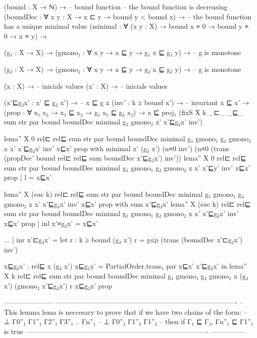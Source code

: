        (bound : X → ℕ) →                     -- bound function 
       -- the bound function is decreasing 
       (boundDec : ∀ {x y : X} → x ⊏ y → bound y < bound x) →  
       -- the bound function has a unique minimal value
       (minimal : ∀ (x y : X) → bound x ≡ 0 → bound y ≡ 0 → x ≡ y) → 

       (g₁ : X → X) → 
       (gmono₁ : ∀ {x y} → x ⊑ y → g₁ x ⊑ g₁ y) → -- g is monotone

       (g₂ : X → X) → 
       (gmono₂ : ∀ {x y} → x ⊑ y → g₂ x ⊑ g₂ y) → -- g is monotone

       (x : X) →                 -- inicials values  
       (x' : X) →                 -- inicials values   

       (x'⊑g₂x' : x' ⊑ g₂ x') →                    -- x ⊑ g x 
       (inv' : k ≥ bound x') →              -- invariant
       x ⊑ x' → 
       (prop : ∀ {x₁ x₂} → x₁ ⊑ x₂ → g₁ x₁ ⊑ g₂ x₂) →  
       x  ⊑ proj₁ (fixS X k _⊏_ _⊑_ sum str par bound boundDec minimal g₂ gmono₂ x' x'⊑g₂x' inv')

lema'' X 0 rel⊏  rel⊑ sum str par bound boundDec minimal g₁ gmono₁ g₂ gmono₂
       x x' x'⊑g₂x' inv' x⊑x' prop
            with minimal x' (g₂ x') (n≡0 inv')
                    (n≡0 (trans (propDec' bound rel⊏  rel⊑ sum boundDec x'⊑g₂x') inv'))
lema'' X 0 rel⊏  rel⊑ sum str par bound boundDec minimal g₁ gmono₁ g₂ gmono₂
       x  x' x'⊑y' inv' x⊑x' prop | l = x⊑x'

lema'' X (suc k) rel⊏  rel⊑ sum str par bound boundDec minimal g₁ gmono₁ g₂ gmono₂
       x x' x'⊑g₂x' inv' x⊑x' prop with sum x'⊑g₂x'
lema'' X (suc k) rel⊏  rel⊑ sum str par bound boundDec minimal g₁ gmono₁ g₂ gmono₂
       x x' x'⊑g₂x' inv' x⊑x' prop | inl x'≡g₂x' = x⊑x'
       
... | inr x'⊏g₂x' = let r :  k ≥ bound (g₂ x')
                        r = p≤p (trans (boundDec x'⊏g₂x') inv') 

                        x⊑g₂x' : rel⊑ x (g₂ x') 
                        x⊑g₂x' = PartialOrder.trans₁ par x⊑x' x'⊑g₂x' 
               in lema'' X k rel⊏ rel⊑ sum str par bound boundDec minimal g₁ gmono₁ g₂
                    gmono₂ x (g₂ x') (gmono₂ x'⊑g₂x') r x⊑g₂x' prop


---------------------
-------------------------------------------------------------------------------
-- This lemma lema is neccesary to prove that if we have two chains of the form: 
-- ⊥ Γ0''₁ Γ1''₁ Γ2''₁ Γ3''₁ .. Γn''₁ 
-- ⊥ Γ0''₂ Γ1''₂ Γ1''₂ 
-- then if Γ₁ ⊑ Γ₂, Γn''₁ ⊑ Γ1''₁ is true
-------------------------------------------------------------------------------
---------------

